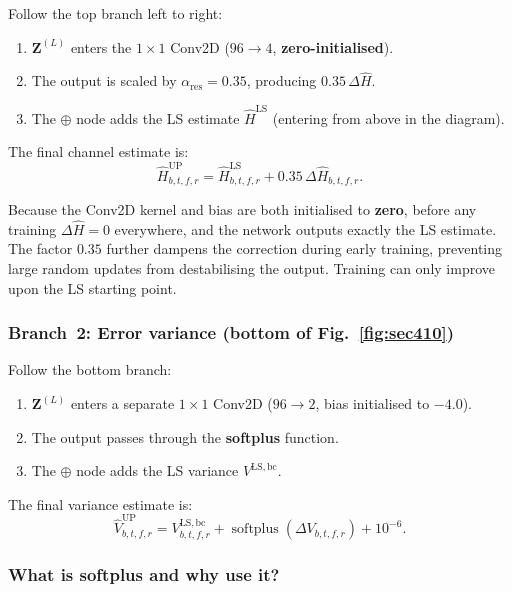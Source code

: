 \documentclass[11pt,a4paper]{article}
\newcommand{\bZ}{\mathbf{Z}}
\DeclareMathOperator{\softplus}{softplus}
\begin{document}
	Follow the top branch left to right:
	\begin{enumerate}[nosep]
		\item $\bZ^{(L)}$ enters the $1 \times 1$ Conv2D ($96 \to 4$, \textbf{zero-initialised}).
		\item The output is scaled by $\alpha_{\mathrm{res}} = 0.35$, producing $0.35\,\Delta\widehat{H}$.
		\item The $\oplus$ node adds the LS estimate $\widehat{H}^{\mathrm{LS}}$ (entering from above in the diagram).
	\end{enumerate}
	The final channel estimate is:
	\begin{equation}
		\widehat{H}^{\mathrm{UP}}_{b,t,f,r} = \widehat{H}^{\mathrm{LS}}_{b,t,f,r} + 0.35\,\Delta\widehat{H}_{b,t,f,r}.
		\label{eq:h_update}
	\end{equation}
	
	Because the Conv2D kernel and bias are both initialised to \textbf{zero}, before any training $\Delta\widehat{H} = 0$ everywhere, and the network outputs exactly the LS estimate.  The factor $0.35$ further dampens the correction during early training, preventing large random updates from destabilising the output.  Training can only improve upon the LS starting point.
	
	\subsubsection*{Branch~2: Error variance (bottom of Fig.~\ref{fig:sec410})}
	
	Follow the bottom branch:
	\begin{enumerate}[nosep]
		\item $\bZ^{(L)}$ enters a separate $1 \times 1$ Conv2D ($96 \to 2$, bias initialised to $-4.0$).
		\item The output passes through the \textbf{softplus} function.
		\item The $\oplus$ node adds the LS variance $V^{\mathrm{LS,bc}}$.
	\end{enumerate}
	The final variance estimate is:
	\begin{equation}
		\widehat{V}^{\mathrm{UP}}_{b,t,f,r} = V^{\mathrm{LS,bc}}_{b,t,f,r} + \softplus(\Delta V_{b,t,f,r}) + 10^{-6}.
		\label{eq:v_update}
	\end{equation}
	
	\subsubsection*{What is softplus and why use it?}
	
\end{document}
